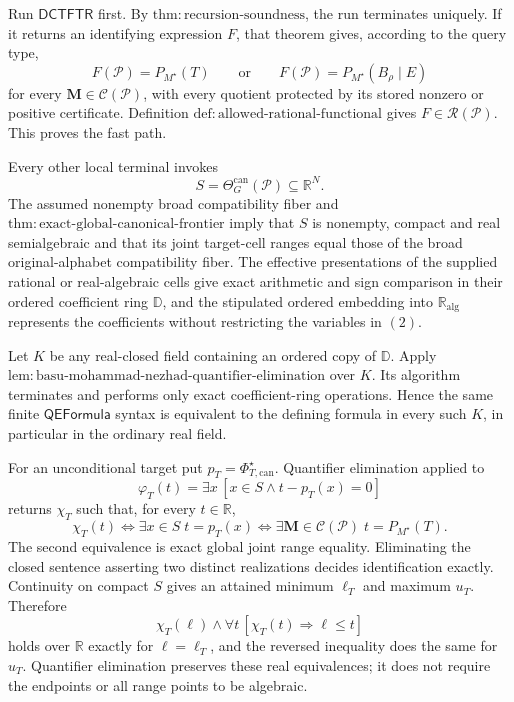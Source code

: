 Run \(\mathsf{DCTFTR}\) first.  By
\(\mathrm{thm:recursion\text{-}soundness}\), the run terminates uniquely.  If it
returns an identifying expression \(F\), that theorem gives, according to the query
type,
\[
F(\mathcal P)=P_{M^\star}(T)
\qquad\text{or}\qquad
F(\mathcal P)=P_{M^\star}(B_\rho\mid E)
\tag{1}
\]
for every \(\mathbf M\in\mathcal C(\mathcal P)\), with every quotient protected by
its stored nonzero or positive certificate.  Definition
\(\mathrm{def:allowed\text{-}rational\text{-}functional}\) gives
\(F\in\mathscr R(\mathcal P)\).  This proves the fast path.

Every other local terminal invokes
\[
S=\Theta_G^{\mathrm{can}}(\mathcal P)\subseteq\mathbb R^N.
\tag{2}
\]
The assumed nonempty broad compatibility fiber and
\(\mathrm{thm:exact\text{-}global\text{-}canonical\text{-}frontier}\) imply that
\(S\) is nonempty, compact and real semialgebraic and that its joint target-cell
ranges equal those of the broad original-alphabet compatibility fiber.  The
effective presentations of the supplied rational or real-algebraic cells give exact
arithmetic and sign comparison in their ordered coefficient ring \(\mathbb D\), and
the stipulated ordered embedding into \(\mathbb R_{\mathrm{alg}}\) represents the
coefficients without restricting the variables in \((2)\).

Let \(K\) be any real-closed field containing an ordered copy of \(\mathbb D\).
Apply
\(\mathrm{lem:basu\text{-}mohammad\text{-}nezhad\text{-}quantifier\text{-}elimination}\)
over \(K\).  Its algorithm terminates and performs only exact coefficient-ring
operations.  Hence the same finite \(\mathsf{QEFormula}\) syntax is equivalent to
the defining formula in every such \(K\), in particular in the ordinary real field.

For an unconditional target put \(p_T=\Phi_{T,\mathrm{can}}^\star\).  Quantifier
elimination applied to
\[
\varphi_T(t)=\exists x\,[x\in S\wedge t-p_T(x)=0]
\tag{3}
\]
returns \(\chi_T\) such that, for every \(t\in\mathbb R\),
\[
\chi_T(t)
\Longleftrightarrow
\exists x\in S\;t=p_T(x)
\Longleftrightarrow
\exists\mathbf M\in\mathcal C(\mathcal P)\;
t=P_{M^\star}(T).
\tag{4}
\]
The second equivalence is exact global joint range equality.  Eliminating the closed
sentence asserting two distinct realizations decides identification exactly.
Continuity on compact \(S\) gives an attained minimum \(\ell_T\) and maximum
\(u_T\).  Therefore
\[
\chi_T(\ell)\wedge
\forall t\,[\chi_T(t)\Longrightarrow\ell\leq t]
\tag{5}
\]
holds over \(\mathbb R\) exactly for \(\ell=\ell_T\), and the reversed inequality
does the same for \(u_T\).  Quantifier elimination preserves these real
equivalences; it does not require the endpoints or all range points to be algebraic.

